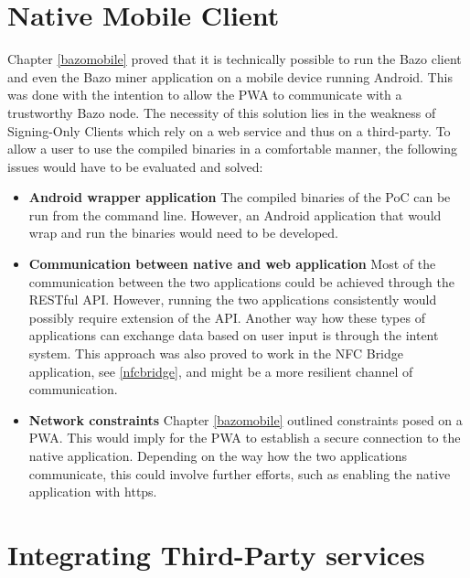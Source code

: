 \section{Native Mobile Client}
Chapter \ref{bazomobile} proved that it is technically possible to run the Bazo client and even the Bazo miner application on a mobile device running Android. This was done with the intention to allow the PWA to communicate with a trustworthy Bazo node. The necessity of this solution lies in the weakness of Signing-Only Clients which rely on a web service and thus on a third-party. To allow a user to use the compiled binaries in a comfortable manner, the following issues would have to be evaluated and solved:
\begin{itemize}
\item \textbf{Android wrapper application} The compiled binaries of the PoC can be run from the command line. However, an Android application that would wrap and run the binaries would need to be developed.
\item \textbf{Communication between native and web application}
Most of the communication between the two applications could be achieved through the RESTful API. However, running the two applications consistently would possibly require extension of the API. Another way how these types of applications can exchange data based on user input is through the intent system. This approach was also proved to work in the NFC Bridge application, see \ref{nfcbridge}, and might be a more resilient channel of communication.
\item \textbf{Network constraints}
Chapter \ref{bazomobile} outlined constraints posed on a PWA. This would imply for the PWA to establish a secure connection to the native application. Depending on the way how the two applications communicate, this could involve further efforts, such as enabling the native application with https.
\end{itemize}


\section{Integrating Third-Party services}

